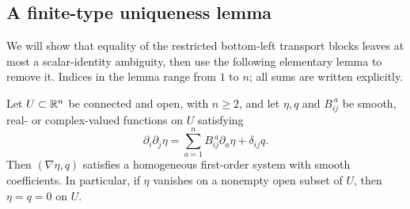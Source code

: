 \subsection{A finite-type uniqueness lemma}

We will show that equality of the restricted bottom-left transport blocks
leaves at most a scalar-identity ambiguity, then use the following
elementary lemma to remove it. Indices
in the lemma range from $1$ to $n$; all sums are written explicitly.

\begin{lemma}\label{lem:finite-type}
Let $U\subset\mathbb R^n$ be connected and open, with $n\ge2$, and let
$\eta,q$ and $B_{ij}^{\ a}$ be smooth, real- or complex-valued functions
on $U$ satisfying
\begin{equation}\label{eq:finite-type-hypothesis}
 \partial_i\partial_j\eta
    =\sum_{a=1}^n B_{ij}^{\ a}\partial_a\eta+\delta_{ij}q.
\end{equation}
Then $(\nabla\eta,q)$ satisfies a homogeneous first-order system with
smooth coefficients.  In particular, if $\eta$ vanishes on a nonempty
open subset of $U$, then $\eta=q=0$ on $U$.
\end{lemma}

